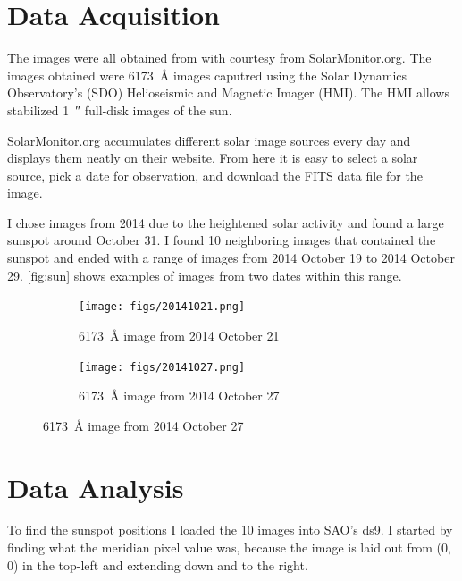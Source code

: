 \documentclass[%
aip,
jmp,
reprint,
floatfix,
]{revtex4-1}
\begin{document}
	\section{Data Acquisition}
	The images were all obtained from with courtesy from SolarMonitor.org. The images obtained were \SI{6173}{\angstrom} images caputred using the Solar Dynamics Observatory's (SDO) Helioseismic and Magnetic Imager (HMI). The HMI allows stabilized \SI{1}{\arcsecond} full-disk images of the sun. 
	
	SolarMonitor.org accumulates different solar image sources every day and displays them neatly on their website. From here it is easy to select a solar source, pick a date for observation, and download the FITS data file for the image. 
	
	I chose images from 2014 due to the heightened solar activity and found a large sunspot around October 31. I found 10 neighboring images that contained the sunspot and ended with a range of images from 2014 October 19 to 2014 October 29. \autoref{fig:sun} shows examples of images from two dates within this range.
	
	\begin{figure}[t]
		\centering
		\begin{subfigure}[]{.4\textwidth}
			\centering
			\texttt{[image: figs/20141021.png]}
			\caption{\SI{6173}{\angstrom} image from 2014 October 21}
		\end{subfigure}
		\qquad
		\begin{subfigure}[]{.4\textwidth}
			\centering
			\texttt{[image: figs/20141027.png]}
			\caption{\SI{6173}{\angstrom} image from 2014 October 27}
		\end{subfigure}
		\label{fig:sun}
	\end{figure}

	\section{Data Analysis}
	To find the sunspot positions I loaded the 10 images into SAO's ds9. I started by finding what the meridian pixel value was, because the image is laid out from (0, 0) in the top-left and extending down and to the right. 
	
\end{document}
